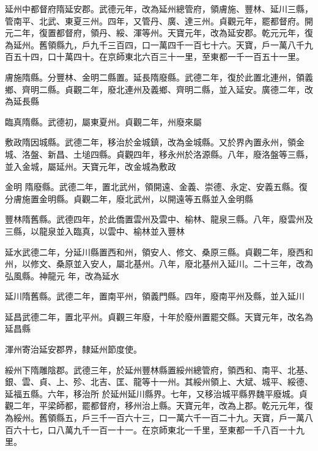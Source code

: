 \begin{pinyinscope}
 延州中都督府隋延安郡。武德元年，改為延州總管府，領膚施、豐林、延川三縣，管南平、北武、東夏三州。四年，又管丹、廣、達三州。貞觀元年，罷都督府。開元二年，復置都督府，領丹、綏、渾等州。天寶元年，改為延安郡。乾元元年，復為延州。舊領縣九，戶九千三百四，口一萬四千一百七十六。天寶，戶一萬八千九百五十四，口十萬四十。在京師東北六百三十一里，至東都一千一百五十一里。



 膚施隋縣。分豐林、金明二縣置。延長隋廢縣。武德二年，復於此置北連州，領義鄉、齊明二縣。貞觀二年，廢北連州及義鄉、齊明二縣，並入延安。廣德二年，改為延長縣



 臨真隋縣。武德初，屬東夏州。貞觀二年，州廢來屬



 敷政隋因城縣。武德二年，移治於金城鎮，改為金城縣。又於界內置永州，領金城、洛盤、新昌、土塠四縣。貞觀四年，移永州於洛源縣。八年，廢洛盤等三縣，並入金城，屬延州。天寶元年，改金城為敷政



 金明
 隋廢縣。武德二年，置北武州，領開遠、金義、崇德、永定、安義五縣。復分膚施置金明縣。貞觀二年，廢北武州，以開遠等五縣並入金明縣



 豐林隋舊縣。武德四年，於此僑置雲州及雲中、榆林、龍泉三縣。八年，廢雲州及三縣，以龍泉並入臨真，以雲中、榆林並入豐林



 延水武德二年，分延川縣置西和州，領安人、修文、桑原三縣。貞觀二年，廢西和州，以修文、桑原並入安人，屬北基州。八年，廢北基州入延川。二十三年，改為弘風縣。神龍元
 年，改為延水



 延川隋舊縣。武德二年，置南平州，領義門縣。四年，廢南平州及縣，並入延川



 延昌武德二年，置北平州。貞觀三年廢，十年於廢州置罷交縣。天寶元年，改名為延昌縣



 渾州寄治延安郡界，隸延州節度使。



 綏州下隋雕陰郡。武德三年，於延州豐林縣置綏州總管府，領西和、南平、北基、銀、雲、貞、上、殄、北吉、匡、龍等十一州。其綏州領上、大斌、城平、綏德、延福五縣。六年，移治所
 於延州延川縣界。七年，又移治城平縣界魏平廢城。貞觀二年，平梁師都，罷都督府，移州治上縣。天寶元年，改為上郡。乾元元年，復為綏州。舊領縣五，戶三千一百六十三，口一萬六千一百二十九。天寶，戶一萬八百六十七，口八萬九千一百一十一。在京師東北一千里，至東都一千八百一十九里。




\end{pinyinscope}
